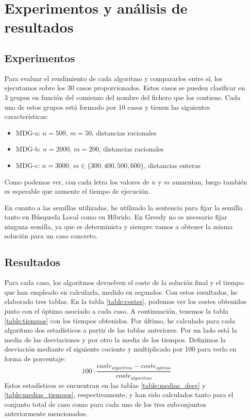 \documentclass[10pt,a4paper]{article}
\begin{document}
\section{Experimentos y análisis de resultados}

\subsection{Experimentos}

Para evaluar el rendimiento de cada algoritmo y compararlos entre sí, los ejecutamos sobre los 30 casos proporcionados. Estos casos se pueden clasificar en 3 grupos en función del comienzo del nombre del fichero que los contiene. Cada uno de estos grupos está formado por 10 casos y tienen las siguientes características:

\begin{itemize}
	\item MDG-a: $n = 500$, $m = 50$, distancias racionales
	\item MDG-b: $n = 2000$, $m = 200$, distancias racionales
	\item MDG-c: $n = 3000$, $m \in \{300,400,500,600\}$, distancias enteras
\end{itemize}

Como podemos ver, con cada letra los valores de $n$ y $m$ aumentan, luego también es esperable que aumente el tiempo de ejecución.

En cuanto a las semillas utilizadas, he utilizado la sentencia  para fijar la semilla tanto en Búsqueda Local como en Híbrido. En Greedy no es necesario fijar ninguna semilla, ya que es determinista y siempre vamos a obtener la misma solución para un caso concreto.




\subsection{Resultados}

Para cada caso, los algoritmos devuelven el coste de la solución final y el tiempo que han empleado en calcularla, medido en segundos. Con estos resultados, he elaborado tres tablas. En la tabla \ref{table:costes}, podemos ver los costes obtenidos junto con el óptimo asociado a cada caso. A continuación, tenemos la tabla \ref{table:tiempos} con los tiempos obtenidos. Por último, he calculado para cada algoritmo dos estadísticos a partir de las tablas anteriores. Por un lado está la media de las desviaciones y por otro la media de los tiempos. Definimos la desviación mediante el siguiente cociente y multiplicado por 100 para verlo en forma de porcentaje:
$$100 \cdot \frac{coste_{algoritmo}-coste_{optimo}}{coste_{algoritmo}}$$
Estos estadísticos se encuentran en las tablas \ref{table:medias_desv} y \ref{table:medias_tiempos}, respectivamente, y han sido calculados tanto para el conjunto total de caso como para cada uno de los tres subconjuntos anteriormente mencionados.
\end{document}
